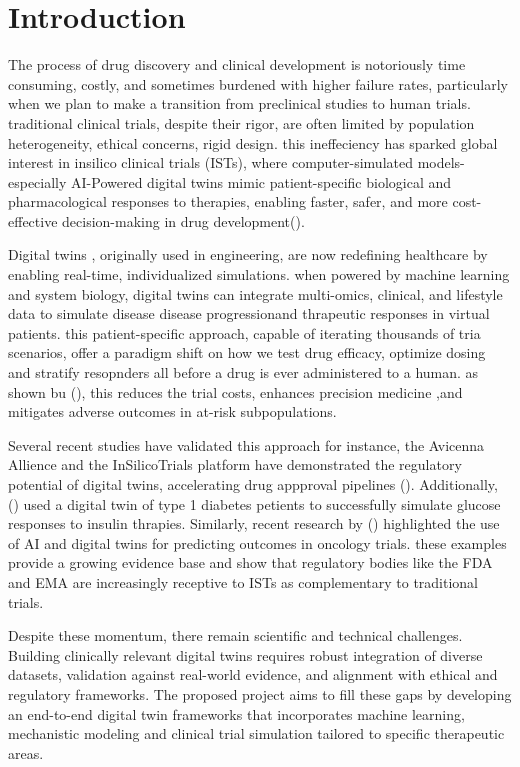 \chapter*{Introduction}

The process of drug \cite{Bjornsson2019-dq} discovery and clinical development is notoriously time consuming, costly, and sometimes burdened
with higher failure rates, particularly when we plan to make a transition from preclinical studies to human trials. traditional clinical trials, despite their rigor, are often limited by population heterogeneity, ethical concerns, rigid design.
this ineffeciency has sparked global interest in insilico clinical trials (ISTs), where computer-simulated models-especially AI-Powered
digital twins \cite{Viceconti_Henney_Morley-Fletcher_2016} mimic patient-specific biological and pharmacological responses to therapies, enabling faster, safer, and more cost-effective 
decision-making in drug development().

Digital twins \cite{Parekh2019-hq}, originally used in engineering, are now redefining healthcare by enabling real-time, individualized simulations.
when powered by machine learning and system biology, digital twins can integrate multi-omics, clinical, and lifestyle data to simulate disease disease progressionand thrapeutic responses in 
virtual patients. this patient-specific approach, capable of iterating thousands of tria scenarios, offer a paradigm shift on how we test drug efficacy, optimize dosing and stratify resopnders all before
a drug is ever administered to a human. as shown bu (), this reduces the trial costs, enhances precision medicine ,and mitigates adverse outcomes in at-risk subpopulations.

Several recent studies have validated this approach for instance, the Avicenna Allience and the InSilicoTrials platform have demonstrated the regulatory
potential of digital twins, accelerating drug appproval pipelines (). Additionally, () used a digital twin of type 1 diabetes petients to successfully 
simulate glucose responses to insulin thrapies. Similarly, recent research by () highlighted the use of AI and digital twins for predicting 
outcomes in oncology trials. these examples provide a growing evidence base and show that regulatory bodies like the FDA and EMA are increasingly receptive
to ISTs as complementary to traditional trials.

Despite these momentum,  there remain scientific and technical challenges. Building clinically relevant digital twins requires 
robust integration of diverse datasets, validation against real-world evidence, and alignment with ethical and regulatory frameworks. The proposed
project aims to fill these gaps by developing an end-to-end digital twin frameworks that incorporates machine learning, mechanistic modeling and clinical 
trial simulation tailored to specific therapeutic areas.

